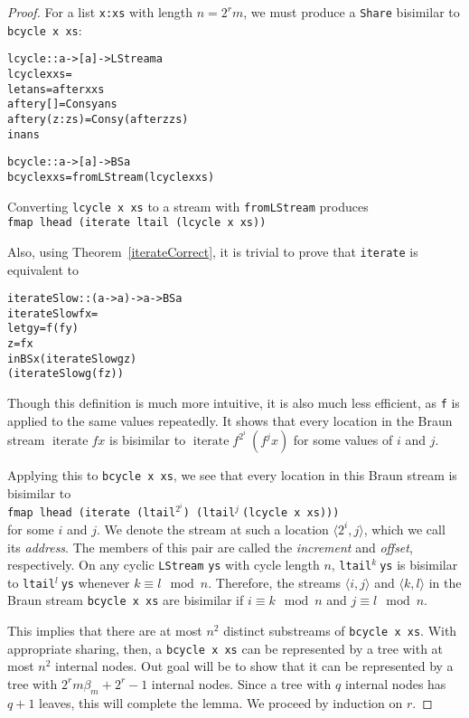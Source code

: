 \documentclass[envcountsect]{llncs}
\DeclareMathOperator{\iter}{iterate}
\newcommand{\share}{{\tt Share} }
\begin{document}
\begin{proof}
For a list {\tt x:xs} with length $n = 2^r m$, we must produce a \share bisimilar to {\tt bcycle x xs}:
\\
\begin{alltt}
lcycle :: a -> [a] -> LStream a
lcycle x xs = 
  let ans = after x xs
      after y [] = Cons y ans
      after y (z:zs) = Cons y (after z zs)
  in ans

bcycle :: a -> [a] -> BS a
bcycle x xs = fromLStream (lcycle x xs)
\end{alltt}

Converting {\tt lcycle x xs} to a stream with {\tt fromLStream} produces 
\\
{\tt fmap lhead (iterate ltail (lcycle x xs))}

Also, using Theorem~\ref{iterateCorrect}, it is trivial to prove that {\tt iterate} is equivalent to

\begin{alltt}
iterateSlow :: (a -> a) -> a -> BS a
iterateSlow f x =
  let g y = f (f y)
      z = f x
  in BS x (iterateSlow g    z) 
          (iterateSlow g (f z))
\end{alltt}

Though this definition is much more intuitive, it is also much less efficient, as {\tt f} is applied to the same values repeatedly.
It shows that every location in the Braun stream $\iter f x$ is bisimilar to $\iter f^{2^i}\ (f^j x)$ for some values of $i$ and $j$.

Applying this to {\tt bcycle x xs}, we see that every location in this Braun stream is bisimilar to 
\\
{\tt fmap lhead (iterate (ltail}$^{2^i}${\tt ) (ltail}$^j\ ${\tt (lcycle x xs)))} 
\\
for some $i$ and $j$.
We denote the stream at such a location $\langle 2^i,j \rangle$, which we call its {\em address}.
The members of this pair are called the {\em increment} and {\em offset}, respectively.
On any cyclic {\tt LStream} {\tt ys} with cycle length $n$, {\tt ltail}$^k\ ${\tt ys} is bisimilar to {\tt ltail}$^l\ ${\tt ys} whenever $k \equiv l \mod n$.
Therefore, the streams $\langle i,j \rangle$ and $\langle k,l \rangle$ in the Braun stream {\tt bcycle x xs} are bisimilar if $i \equiv k \mod n$ and $j \equiv l \mod n$.

This implies that there are at most $n^2$ distinct substreams of {\tt bcycle x xs}.
With appropriate sharing, then, a {\tt bcycle x xs} can be represented by a tree with at most $n^2$ internal nodes.
Out goal will be to show that it can be represented by a tree with $2^r m \beta_m + 2^r - 1$ internal nodes.
Since a tree with $q$ internal nodes has $q+1$ leaves, this will complete the lemma.
We proceed by induction on $r$. 


\end{proof}
\end{document}

